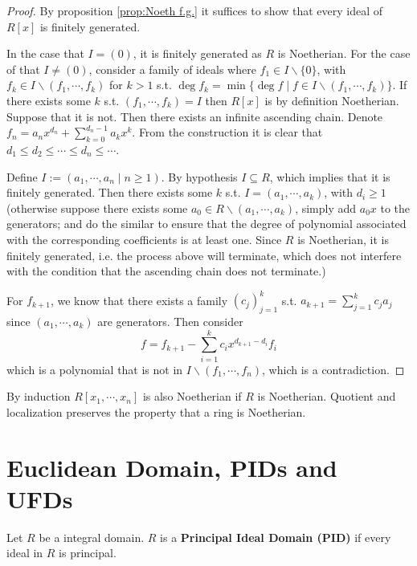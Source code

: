 \documentclass{article}
\begin{document}
\begin{proof}
    By proposition \ref{prop:Noeth f.g.} it suffices to show that every ideal of $R[x]$ is finitely generated. 

    In the case that $I = (0)$, it is finitely generated as $R$ is Noetherian. For the case of that $I \neq (0)$, consider a family of ideals where $f_1 \in I\smallsetminus\{0\}$, with $f_k \in I \smallsetminus (f_1, \cdots, f_k)$ for $k > 1$ s.t. $\deg f_k = \min \{\deg f \mid f \in I \smallsetminus (f_1, \cdots, f_k) \}$. If there exists some $k$ s.t. $(f_1, \cdots, f_k) = I$ then $R[x]$ is by definition Noetherian. Suppose that it is not. Then there exists an infinite ascending chain. Denote $f_n = a_n x^{d_n} + \sum\limits_{k=0}^{d_n - 1} a_k x^k$. From the construction it is clear that $d_1 \leq d_2 \leq\cdots\leq d_n\leq\cdots$.

    Define $I := (a_1, \cdots, a_n \mid n \geq 1)$. By hypothesis $I \subseteq R$, which implies that it is finitely generated. Then there exists some $k$ s.t. $I = (a_1, \cdots, a_k)$, with $d_i \geq 1$ (otherwise suppose there exists some $a_0\in R\smallsetminus (a_1, \cdots, a_k)$, simply add $a_0 x$ to the generators; and do the similar to ensure that the degree of polynomial associated with the corresponding coefficients is at least one. Since $R$ is Noetherian, it is finitely generated, i.e. the process above will terminate, which does not interfere with the condition that the ascending chain does not terminate.) 
    
    For $f_{k+1}$, we know that there exists a family $(c_j)_{j=1}^k$ s.t. $a_{k+1} = \sum\limits_{j=1}^k c_j a_j$ since $(a_1, \cdots, a_k)$ are generators. Then consider
    \[
        f = f_{k+1} - \sum\limits_{i=1}^k c_i x^{d_{k+1} - d_i} f_i
    \]
    which is a polynomial that is not in $I\smallsetminus (f_1, \cdots, f_n)$, which is a contradiction.
\end{proof}

\begin{corollary}
    By induction $R[x_1, \cdots, x_n]$ is also Noetherian if $R$ is Noetherian. Quotient and localization preserves the property that a ring is Noetherian.
\end{corollary}

\section{Euclidean Domain, PIDs and UFDs}

\begin{definition}
    Let $R$ be a integral domain. $R$ is a \textbf{Principal Ideal Domain (PID)} if every ideal in $R$ is principal.
\end{definition}
\end{document}
